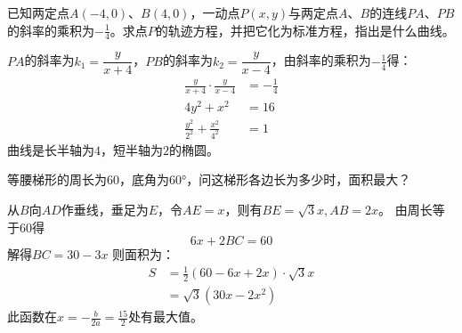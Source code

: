 \documentclass[answers]{exam}
\begin{document}
\begin{questions}
\begin{solution}
\begin{enumerate}[label=\Roman*.]
		\end{enumerate}
	\end{solution}

	\question
	已知两定点$A(-4,0)$、$B(4,0)$，一动点$P(x,y)$与两定点$A$、$B$的连线$PA$、$PB$的斜率的乘积为$-\frac14$。求点$P$的轨迹方程，并把它化为标准方程，指出是什么曲线。
	\begin{solution}
		$PA$的斜率为$k_1 = \dfrac{y}{x+4}$，$PB$的斜率为$k_2 = \dfrac{y}{x-4}$，由斜率的乘积为$-\frac14$得：
		\begin{align*}
			\frac{y}{x+4}\cdot\frac{y}{x-4}   & = -\frac14 \\
			4y^2 + x^2                        & = 16       \\
			\frac{y^2}{2^2} + \frac{x^2}{4^2} & = 1
		\end{align*}
		曲线是长半轴为$4$，短半轴为$2$的椭圆。
	\end{solution}

	\question 等腰梯形的周长为$60$，底角为\ang{60}，问这梯形各边长为多少时，面积最大？
	\begin{figure*}[ht]
		\centering
	\end{figure*}

	\begin{solution}
		从$B$向$AD$作垂线，垂足为$E$，令$AE=x$，则有$BE=\sqrt{3}x, AB=2x$。
		由周长等于$60$得
		\begin{equation*}
			6x + 2BC = 60
		\end{equation*}
		解得$BC = 30 - 3x$
		则面积为：
		\begin{align*}
			S & = \frac12(60-6x + 2x)\cdot\sqrt{3}x \\
			  & = \sqrt{3}(30x - 2x^2)
		\end{align*}
		此函数在$x=-\frac{b}{2a} = \frac{15}{2}$处有最大值。


\end{solution}
\end{questions}
\end{document}
